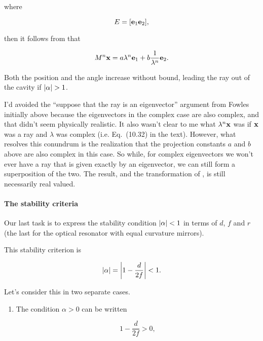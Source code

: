 {where

\begin{dmath}\label{eqn:problemSet4Problem2:360}
E = [ \Be_1 \Be_2 ],
\end{dmath}

then it follows from  that

\begin{dmath}\label{eqn:problemSet4Problem2:380}
M^n \Bx = a \lambda^n \Be_1 + b \inv{\lambda^n} \Be_2.
\end{dmath}

Both the position and the angle increase without bound, leading the ray out of the cavity if ${\left\lvert{\alpha}\right\rvert} > 1$.

I'd avoided the ``suppose that the ray is an eigenvector'' argument from Fowles initially above because the eigenvectors in the complex case are also complex, and that didn't seem physically realistic.  It also wasn't clear to me what $\lambda^n \mathbf{x}$ was if $\mathbf{x}$ was a ray and $\lambda$ was complex (i.e.  Eq.~(10.32) in the text).  However, what resolves this conundrum is the realization that the projection constants $a$ and $b$ above are also complex in this case.  So while, for complex eigenvectors we won't ever have a ray that is given exactly by an eigenvector, we can still form a superposition of the two.  The result, and the transformation of , is still necessarily real valued.

\paragraph{The stability criteria}

Our last task is to express the stability condition ${\left\lvert{\alpha}\right\rvert} < 1$ in terms of $d$, $f$ and $r$ (the last for the optical resonator with equal curvature mirrors).

This stability criterion is

\begin{equation}\label{eqn:problemSet4Problem2:400}
{\left\lvert{\alpha}\right\rvert} = {\left\lvert{1 - \frac{d}{2f}}\right\rvert} < 1.
\end{equation}

Let's consider this in two separate cases.
\begin{enumerate}
\item The condition $\alpha > 0$ can be written

\begin{dmath}\label{eqn:problemSet4Problem2:420}
1 - \frac{d}{2f} > 0 ,
\end{dmath}


\end{enumerate}}
